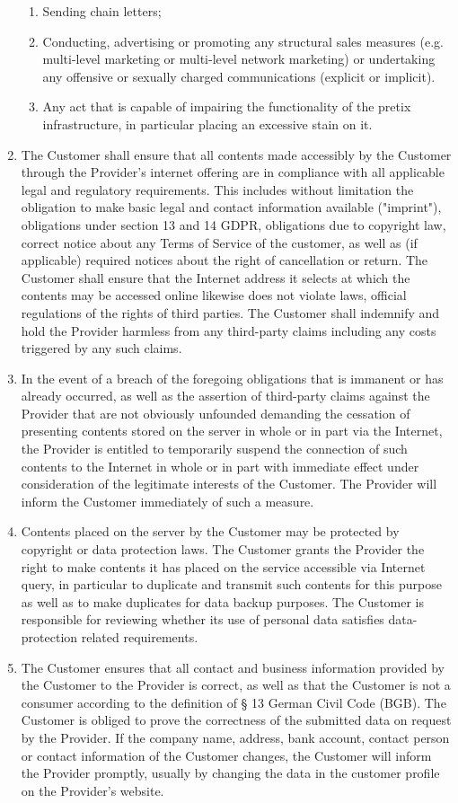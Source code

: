 \documentclass{terms}
\begin{document}
\begin{enumerate}
\begin{enumerate}
\item Sending chain letters;
\item Conducting, advertising or promoting any structural sales measures (e.g. multi-level marketing or multi-level network marketing) or undertaking any offensive or sexually charged communications (explicit or implicit).
\item Any act that is capable of impairing the functionality of the pretix infrastructure, in particular placing an excessive stain on it.
\end{enumerate}
\item The Customer shall ensure that all contents made accessibly by the Customer through the Provider's internet offering are in compliance with all applicable legal and regulatory requirements. This includes without limitation the obligation to make basic legal and contact information available ("imprint"), obligations under section 13 and 14 GDPR, obligations due to copyright law, correct notice about any Terms of Service of the customer, as well as (if applicable) required notices about the right of cancellation or return. The Customer shall ensure that the Internet address it selects at which the contents may be accessed online likewise does not violate laws, official regulations of the rights of third parties. The Customer shall indemnify and hold the Provider harmless from any third-party claims including any costs triggered by any such claims.
\item In the event of a breach of the foregoing obligations that is immanent or has already occurred, as well as the assertion of third-party claims against the Provider that are not obviously unfounded demanding the cessation of presenting contents stored on the server in whole or in part via the Internet, the Provider is entitled to temporarily suspend the connection of such contents to the Internet in whole or in part with immediate effect under consideration of the legitimate interests of the Customer. The Provider will inform the Customer immediately of such a measure.
\item Contents placed on the server by the Customer may be protected by copyright or data protection laws. The Customer grants the Provider the right to make contents it has placed on the service accessible via Internet query, in particular to duplicate and transmit such contents for this purpose as well as to make duplicates for data backup purposes. The Customer is responsible for reviewing whether its use of personal data satisfies data-protection related requirements.
\item The Customer ensures that all contact and business information provided by the Customer to the Provider is correct, as well as that the Customer is not a consumer according to the definition of § 13 German Civil Code (BGB). The Customer is obliged to prove the correctness of the submitted data on request by the Provider. If the company name, address, bank account, contact person or contact information of the Customer changes, the Customer will inform the Provider promptly, usually by changing the data in the customer profile on the Provider’s website.
\end{enumerate}
\end{document}
